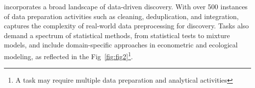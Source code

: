 \begin{table}
\vspace{-1.2em}
\centering
\small
{}\vspace{-2pt}
\caption{\small Statistics for \real{}} \label{tab:real-stat}  \vspace{-3pt}
\end{table}
\discoverybench{} incorporates a broad landscape of data-driven discovery.
With over 500 instances of data preparation activities such as cleaning, deduplication, and integration, captures the complexity of real-world data preprocessing for discovery.
Tasks also demand a spectrum of statistical methods, from statistical tests to mixture models, and include domain-specific approaches in econometric and ecological modeling, as reflected in the Fig~\ref{fig:fig2}\footnote{A task may require multiple data preparation and analytical activities}.









